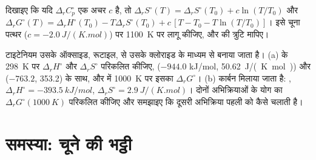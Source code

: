 \begin{exercise}[$\star\star\star$]\label{exo:b2:reaction-free-energy:11}
दिखाइए कि यदि $\Delta_r C^\circ_p$ एक अचर $c$ है, तो
$\Delta_r S^\circ(T) = \Delta_r S^\circ(T_0) + c\ln(T/T_0)$ और
$\Delta_r G^\circ(T) = \Delta_r H^\circ(T_0) - T\Delta_r S^\circ(T_0) +
c\,[T - T_0 - T\ln(T/T_0)]$। इसे चूना पत्थर ($c =
\qty{-2.0}{J/(K.mol)}$) पर \qty{1100}{K} पर लागू कीजिए, और
 की त्रुटि मापिए।
\end{exercise}

\begin{exercise}[$\star\star\star$]\label{exo:b2:reaction-free-energy:12}
टाइटेनियम उसके ऑक्साइड, रूटाइल, से उसके क्लोराइड के माध्यम से बनाया जाता है। (a)
 के \qty{298}{K} पर $\Delta_r H^\circ$ और $\Delta_r S^\circ$ परिकलित कीजिए,
 ($-944.0$ \unit{kJ/mol},
\qty{50.62}{J/(K.mol)}) और  ($-763.2$, 353.2) के साथ, और  में
\qty{1000}{K} पर इसका $\Delta_r G^\circ$।
(b) कार्बन मिलाया जाता है: , $\Delta_r H^\circ =
\qty{-393.5}{kJ/mol}$, $\Delta_r S^\circ = \qty{+2.9}{J/(K.mol)}$। दोनों अभिक्रियाओं के
योग का $\Delta_r G^\circ(\qty{1000}{K})$ परिकलित कीजिए और
समझाइए कि दूसरी अभिक्रिया पहली को कैसे चलाती है।
\end{exercise}

\section{समस्या: चूने की भट्ठी}

